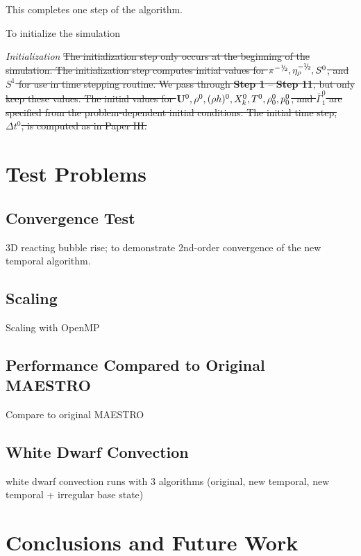 \documentclass{aastex62}
\newcommand{\sfrac}[2]{\mathchoice
  {\kern0em\raise.5ex\hbox{\the\scriptfont0 #1}\kern-.15em/
   \kern-.15em\lower.25ex\hbox{\the\scriptfont0 #2}}
  {\kern0em\raise.5ex\hbox{\the\scriptfont0 #1}\kern-.15em/
   \kern-.15em\lower.25ex\hbox{\the\scriptfont0 #2}}
  {\kern0em\raise.5ex\hbox{\the\scriptscriptfont0 #1}\kern-.2em/
   \kern-.15em\lower.25ex\hbox{\the\scriptscriptfont0 #2}}
  {#1\!/#2}}
\newcommand{\myhalf}{\sfrac{1}{2}}
\newcommand{\Ub}{{\bf{U}}}
\newcommand{\dt}{\Delta t}
\newcommand{\gammaonebar}{\overline{\Gamma}_1}
\begin{document}
This completes one step of the algorithm.

To initialize the simulation



{\em Initialization}
\sout{
The initialization step only occurs at the beginning of the simulation.
The initialization step computes initial values for 
$\pi^{-\myhalf}, \eta_{\rho}^{-\myhalf}, S^0$, and $S^1$ for use in time stepping routine.  
We pass through {\bf Step 1} -- {\bf Step 11}, but only keep these values.
The initial values for $\Ub^0, \rho^0, (\rho h)^0, X_k^0, T^0,
\rho_0^0, p_0^0$, and $\gammaonebar^0$ are specified from the problem-dependent
initial conditions.  The initial time step, $\dt^0$, is computed as in
Paper III.
}

\section{Test Problems}

\subsection{Convergence Test}
3D reacting bubble rise; to demonstrate 2nd-order convergence of the new temporal algorithm.

\subsection{Scaling}
Scaling with OpenMP

\subsection{Performance Compared to Original MAESTRO}
Compare to original MAESTRO

\subsection{White Dwarf Convection}
white dwarf convection runs with 3 algorithms (original, new temporal, new temporal + irregular base state)

\section{Conclusions and Future Work}
\end{document}
